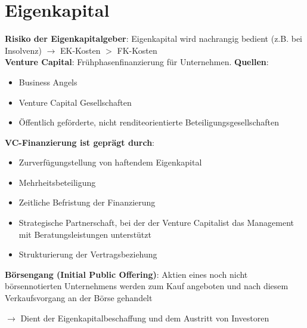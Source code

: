 \section{Eigenkapital}

\textbf{Risiko der Eigenkapitalgeber}: Eigenkapital wird nachrangig bedient (z.B. bei Insolvenz) $\rightarrow$ EK-Kosten $>$ FK-Kosten\\

\textbf{Venture Capital}: Frühphasenfinanzierung für Unternehmen. \textbf{Quellen}:
\begin{itemize}
	\item Business Angels
	\item Venture Capital Gesellschaften
	\item Öffentlich geförderte, nicht renditeorientierte Beteiligungsgesellschaften
\end{itemize}

\textbf{VC-Finanzierung ist geprägt durch}:
\begin{itemize}
	\item Zurverfügungstellung von haftendem Eigenkapital
	\item Mehrheitsbeteiligung
	\item Zeitliche Befristung der Finanzierung 
	\item Strategische Partnerschaft, bei der der Venture Capitalist das Management mit Beratungsleistungen unterstützt
	\item Strukturierung der Vertragsbeziehung
\end{itemize}
\bigskip
\textbf{Börsengang (Initial Public Offering)}: Aktien eines noch nicht börsennotierten Unternehmens werden zum Kauf angeboten und nach diesem Verkaufsvorgang an der Börse gehandelt

$\rightarrow$ Dient der Eigenkapitalbeschaffung und dem Austritt von Investoren

